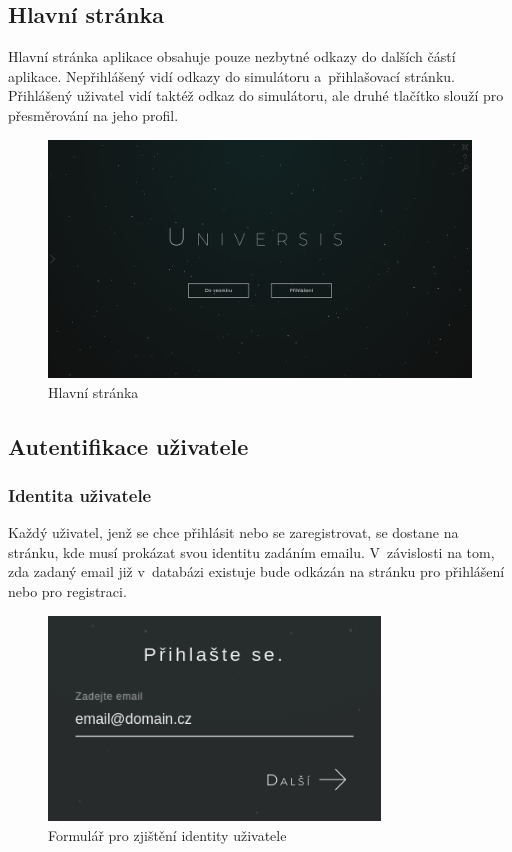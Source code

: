 \documentclass[a4paper,12pt]{article}
\begin{document}
\subsection{Hlavní stránka}

Hlavní stránka aplikace obsahuje pouze nezbytné odkazy do dalších částí aplikace. Nepřihlášený vidí odkazy do simulátoru a~přihlašovací stránku. Přihlášený uživatel vidí taktéž odkaz do simulátoru, ale druhé tlačítko slouží pro přesměrování na jeho profil.

\begin{figure}[H]
\begin{center}
\includegraphics[width=450pt]{Images/MainPage.png}
\caption{Hlavní stránka}
\end{center}
\end{figure}

\subsection{Autentifikace uživatele}

\subsubsection{Identita uživatele}

Každý uživatel, jenž se chce přihlásit nebo se zaregistrovat, se dostane na stránku, kde musí prokázat svou identitu zadáním emailu. V~závislosti na tom, zda zadaný email již v~databázi existuje bude odkázán na stránku pro přihlášení nebo pro registraci.

\begin{figure}[H]
\begin{center}
\includegraphics[width=250pt]{Images/Identity.png}
\caption{Formulář pro zjištění identity uživatele}
\label{Identity}
\end{center}
\end{figure}
\end{document}
